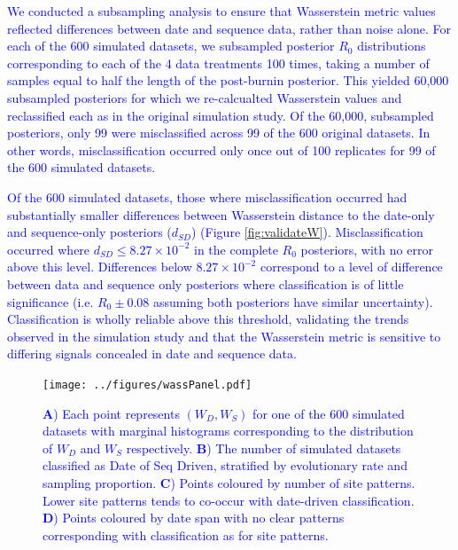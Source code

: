 \documentclass{article}
\begin{document}

\textcolor{blue}{We conducted a subsampling analysis to ensure that Wasserstein metric values reflected differences between date and sequence data, rather than noise alone. For each of the 600 simulated datasets, we subsampled posterior $R_{0}$ distributions corresponding to each of the 4 data treatments 100 times, taking a number of samples equal to half the length of the post-burnin posterior. This yielded 60,000 subsampled posteriors for which we re-calcualted Wasserstein values and reclassified each as in the original simulation study. Of the 60,000, subsampled posteriors, only 99 were misclassified across 99 of the 600 original datasets. In other words, misclassification occurred only once out of 100 replicates for 99 of the 600 simulated datasets.}

\textcolor{blue}{Of the 600 simulated datasets, those where misclassification occurred had substantially smaller differences between Wasserstein distance to the date-only and sequence-only posteriors ($d_{SD}$) (Figure \ref{fig:validateW}). Misclassification occurred where $d_{SD} \le 8.27\times10^{-2}$ in the complete $R_0$ posteriors, with no error above this level. Differences below $8.27\times10^{-2}$ correspond to a level of difference between data and sequence only posteriors where classification is of little significance (i.e. $R_0 \pm 0.08$ assuming both posteriors have similar uncertainty). Classification is wholly reliable above this threshold, validating the trends observed in the simulation study and that the Wasserstein metric is sensitive to differing signals concealed in date and sequence data.}

\begin{figure}[H]
\centering
\texttt{[image: ../figures/wassPanel.pdf]}
\caption{\textcolor{blue}{ \textbf{A}) Each point represents $(W_D, W_S)$ for one of the 600 simulated datasets with marginal histograms corresponding to the distribution of $W_D$ and $W_S$ respectively. \textbf{B}) The number of simulated datasets classified as Date of Seq Driven, stratified by evolutionary rate and sampling proportion. \textbf{C}) Points coloured by number of site patterns. Lower site patterns tends to co-occur with date-driven classification. \textbf{D}) Points coloured by date span with no clear patterns corresponding with classification as for site patterns. }}
\label{fig:wData}
\end{figure}
\end{document}
